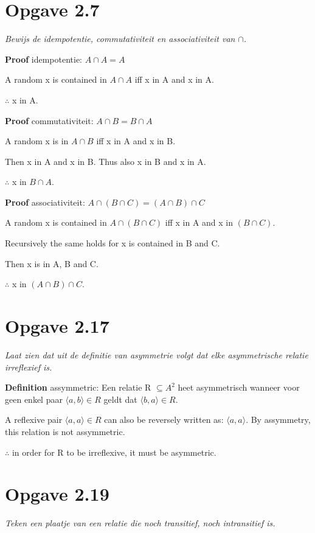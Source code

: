 \documentclass[11pt]{article}
\begin{document}
\section*{Opgave 2.7}
\textit{Bewijs de idempotentie, commutativiteit en associativiteit van
$ \cap $.}
\newline

\textbf{Proof} idempotentie: $ A \cap A = A $

A random x is contained in $ A \cap A $ iff x in A and x in A.

$ \therefore $ x in A.

\textbf{Proof} commutativiteit: $ A \cap B = B \cap A $

A random x is in $ A \cap B $ iff x in A and x in B.

Then x in A and x in B. Thus also x in B and x in A.

$ \therefore $ x in $ B \cap A $.

\textbf{Proof} associativiteit: $ A \cap (B \cap C) = (A \cap B) \cap C $

A random x is contained in $ A \cap (B \cap C) $ iff x in A and x in
$ (B \cap C) $.

Recursively the same holds for x is contained in B and C.

Then x is in A, B and C.

$ \therefore $ x in $ (A \cap B) \cap C $.


\section*{Opgave 2.17}
\textit{Laat zien dat uit de definitie van asymmetrie volgt dat elke asymmetrische relatie irreﬂexief is.}
\newline

\textbf{Definition} assymmetric: Een relatie R $ \subseteq A^2 $ heet asymmetrisch wanneer voor geen enkel paar $ \langle a, b \rangle \in R $ geldt dat $ \langle b, a \rangle \in R $.
\newline

A reflexive pair $ \langle a, a \rangle \in R $ can also be reversely written as: $ \langle a, a \rangle $. By assymmetry, this relation is not assymmetric.

$ \therefore $ in order for R to be irreflexive, it must be asymmetric.


\section*{Opgave 2.19}
\textit{Teken een plaatje van een relatie die noch transitief, noch intransitief is.}
\newline
\end{document}
